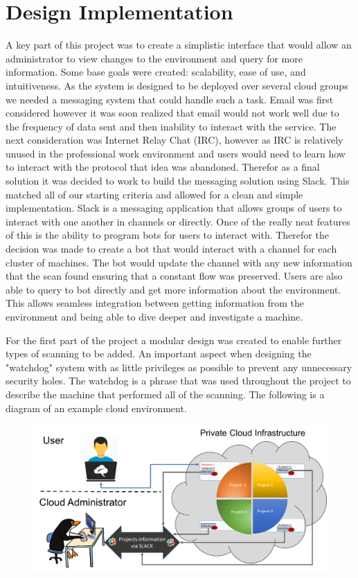 \documentclass[12pt]{article}
\begin{document}
\section{Design Implementation}
A key part of this project was to create a simplistic interface that would allow an administrator to view changes to the environment and query for more information. Some base goals were created: scalability, ease of use, and intuitiveness. As the system is designed to be deployed over several cloud groups we needed a messaging system that could handle such a task. Email was first considered however it was soon realized that email would not work well due to the frequency of data sent and then inability to interact with the service. The next consideration was Internet Relay Chat (IRC), however as IRC is relatively unused in the professional work environment and users would need to learn how to interact with the protocol that idea was abandoned. Therefor as a final solution it was decided to work to build the messaging solution using Slack. This matched all of our starting criteria and allowed for a clean and simple implementation. Slack is a messaging application that allows groups of users to interact with one another in channels or directly. Once of the really neat features of this is the ability to program bots for users to interact with. Therefor the decision was made to create a bot that would interact with a channel for each cluster of machines. The bot would update the channel with any new information that the scan found ensuring that a constant flow was preserved. Users are also able to query to bot directly and get more information about the environment. This allows seamless integration between getting information from the environment and being able to dive deeper and investigate a machine.

For the first part of the project a modular design was created to enable further types of scanning to be added. An important aspect when designing the "watchdog" system with as little privileges as possible to prevent any unnecessary security holes. The watchdog is a phrase that was used throughout the project to describe the machine that performed all of the scanning. The following is a diagram of an example cloud environment.

\begin{figure}[H]
    \centering
    \includegraphics[scale=.4]{./pic/Picture1.png}
\end{figure}
\end{document}
